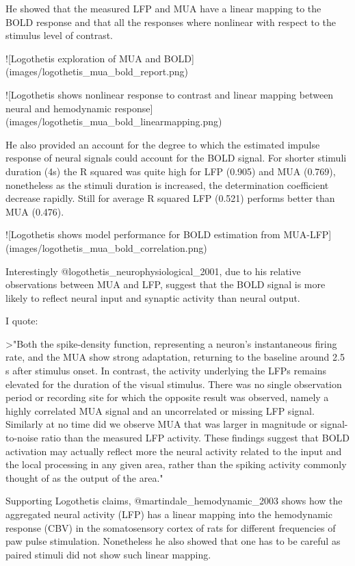 He showed that the measured LFP and MUA have a linear mapping to the BOLD  response and that all the responses where nonlinear with respect to the  stimulus level of contrast.

![Logothetis exploration of MUA and BOLD](images/logothetis_mua_bold_report.png)

![Logothetis shows nonlinear response to contrast and linear mapping between neural and hemodynamic response](images/logothetis_mua_bold_linearmapping.png)

He also provided an account for the degree to  which the estimated impulse response of neural signals could account for the  BOLD signal. For shorter stimuli duration (4s) the R squared was quite high for LFP  (0.905) and MUA (0.769), nonetheless as the stimuli duration is increased, the determination coefficient decrease rapidly. Still for average R squared LFP (0.521) performs better than MUA (0.476).

![Logothetis shows model performance for BOLD estimation from MUA-LFP](images/logothetis_mua_bold_correlation.png)

Interestingly @logothetis_neurophysiological_2001, due to his relative observations between MUA and LFP, suggest that the BOLD signal is more likely to reflect neural input and synaptic activity than neural output.

I quote:

>"Both the spike-density function, representing a neuron's instantaneous firing rate, and the MUA show strong adaptation, returning to the baseline around 2.5 s after stimulus onset. In contrast, the activity underlying the LFPs remains elevated for the duration of the visual stimulus. There was no single observation period or recording site for which the opposite result was observed, namely a highly correlated MUA signal and an uncorrelated or missing LFP signal. Similarly at no time did we observe MUA that was larger in magnitude or signal-to-noise ratio than the measured LFP activity. These findings suggest that BOLD activation may actually reflect more the neural activity related to the input and the local processing in any given area, rather than the spiking activity commonly thought of as the output of the area."

Supporting Logothetis claims, @martindale_hemodynamic_2003 shows how the aggregated neural activity (LFP) has a linear mapping into the hemodynamic response (CBV) in the somatosensory cortex of rats for different frequencies of paw pulse stimulation. Nonetheless he also showed that one has to be careful as paired stimuli did not show such linear mapping.


